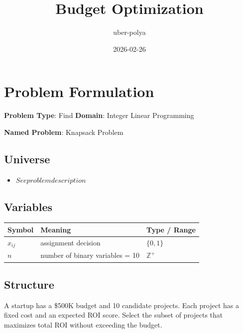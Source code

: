 \documentclass[11pt, a4paper]{article}
\title{Budget Optimization}
\author{uber-polya}
\date{2026-02-26}
\begin{document}
\maketitle
\tableofcontents
\newpage

\section{Problem Formulation}

\begin{polyamodel}

\textbf{Problem Type}: Find \hfill
\textbf{Domain}: Integer Linear Programming

\textbf{Named Problem}: Knapsack Problem

\end{polyamodel}

\subsection{Universe}

\begin{itemize}
  \item $See problem description$
\end{itemize}

\subsection{Variables}

\begin{longtable}{lll}
\toprule
\textbf{Symbol} & \textbf{Meaning} & \textbf{Type / Range} \\
\midrule
\endhead
$x_{ij}$ & assignment decision & $\{0, 1\}$ \\
$n$ & number of binary variables = 10 & $\mathbb{{Z}}^+$ \\
\bottomrule
\end{longtable}

\subsection{Structure}

A startup has a \$500K budget and 10 candidate projects. Each project has a fixed
cost and an expected ROI score. Select the subset of projects that maximizes
total ROI without exceeding the budget.
\end{document}
